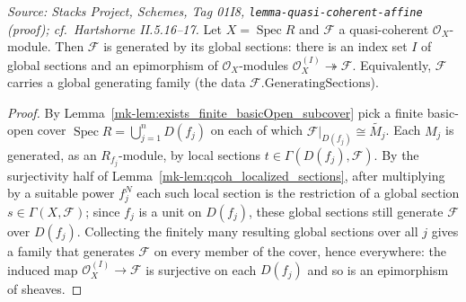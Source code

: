 \begin{lemma}
  \label{mk-lem:qcoh_global_generation}

  \textit{Source: Stacks Project, Schemes, Tag 01I8, \texttt{lemma-quasi-coherent-affine}
  (proof); cf.\ Hartshorne II.5.16--17.}
  Let \(X = \operatorname{Spec} R\) and \(\mathcal{F}\) a quasi-coherent
  \(\mathcal{O}_X\)-module. Then \(\mathcal{F}\) is generated by its global sections:
  there is an index set \(I\) of global sections and an epimorphism of
  \(\mathcal{O}_X\)-modules \(\mathcal{O}_X^{(I)} \twoheadrightarrow \mathcal{F}\).
  Equivalently, \(\mathcal{F}\) carries a global generating family (the data
  \(\mathcal{F}.\mathrm{GeneratingSections}\)).
\end{lemma}
\begin{proof}
  By Lemma~\ref{mk-lem:exists_finite_basicOpen_subcover} pick a finite basic-open cover
  \(\operatorname{Spec} R = \bigcup_{j=1}^{n} D(f_j)\) on each of which
  \(\mathcal{F}|_{D(f_j)} \cong \widetilde{M_j}\). Each \(M_j\) is generated, as an
  \(R_{f_j}\)-module, by local sections \(t \in \Gamma(D(f_j), \mathcal{F})\). By the
  surjectivity half of Lemma~\ref{mk-lem:qcoh_localized_sections}, after multiplying by a
  suitable power \(f_j^{N}\) each such local section is the restriction of a global
  section \(s \in \Gamma(X, \mathcal{F})\); since \(f_j\) is a unit on \(D(f_j)\), these
  global sections still generate \(\mathcal{F}\) over \(D(f_j)\). Collecting the finitely
  many resulting global sections over all \(j\) gives a family that generates
  \(\mathcal{F}\) on every member of the cover, hence everywhere: the induced map
  \(\mathcal{O}_X^{(I)} \to \mathcal{F}\) is surjective on each \(D(f_j)\) and so is an
  epimorphism of sheaves.
\end{proof}

